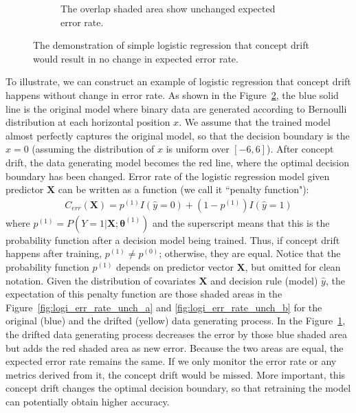 \documentclass[twoside,11pt]{article}
\begin{document}
\begin{figure}[!htbp]
\begin{subfigure}[t]{0.6\linewidth}
         \caption{The overlap shaded area show unchanged expected error rate.}
         \label{fig:logi_err_rate_unch_c}
  \end{subfigure}
  \caption{The demonstration of simple logistic regression that concept drift would result in no change in expected error rate.}
  \label{fig:logi_err_rate_unch}
\end{figure}

To illustrate, we can construct an example of logistic regression that concept drift happens without change in error rate. As shown in the Figure~\ref{fig:logi_err_rate_unch}, the blue solid line is the original model where binary data are generated according to Bernoulli distribution at each horizontal position $x$. We assume that the trained model almost perfectly captures the original model, so that the decision boundary is the $x=0$ (assuming the distribution of $x$ is uniform over $[-6, 6]$). After concept drift, the data generating model becomes the red line, where the optimal decision boundary has been changed. Error rate of the logistic regression model given predictor $\bm {X}$ can be written as a function (we call it ``penalty function"):
\begin{align}
C _{err}(\bm {X}) = p ^{(1)}I(\hat{y}=0)+(1-p ^{(1)})I(\hat{y}=1)
\label{eqn:penal_err}
\end{align}
where $p ^{(1)} = P(Y=1|\bm {X}; \bm { \theta} ^{(1)})$ and the superscript means that this is the probability function after a decision model being trained. Thus, if concept drift happens after training, $p ^{(1)} \neq p ^{(0)}$; otherwise, they are equal. Notice that the probability function $p ^{(1)}$ depends on predictor vector $\bm {X}$, but omitted for clean notation. Given the distribution of covariates $\bm {X}$ and decision rule (model) $\hat{y}$, the expectation of this penalty function are those shaded areas in the Figure~\ref{fig:logi_err_rate_unch_a} and \ref{fig:logi_err_rate_unch_b} for the original (blue) and the drifted (yellow) data generating process. In the Figure~\ref{fig:logi_err_rate_unch_c}, the drifted data generating process decreases the error by those blue shaded area but adds the red shaded area as new error. Because the two areas are equal, the expected error rate remains the same. If we only monitor the error rate or any metrics derived from it, the concept drift would be missed. More important, this concept drift changes the optimal decision boundary, so that retraining the model can potentially obtain higher accuracy. 
\end{document}
